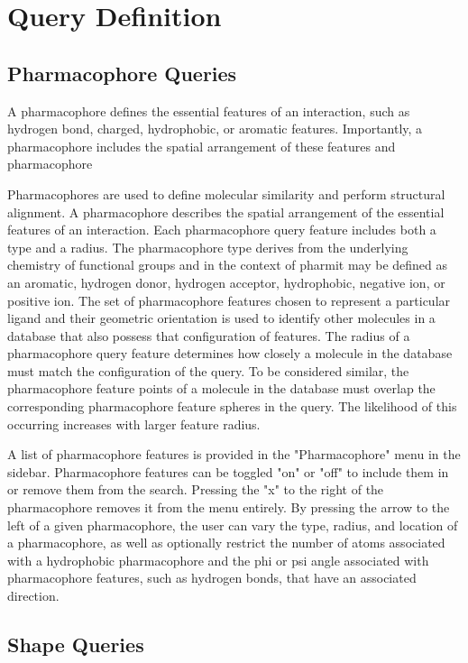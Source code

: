 \section{Query Definition}

\subsection{Pharmacophore Queries}
A pharmacophore \cite{Koes_2015rev,Yang_2010,Leach_2010} defines the essential features of an interaction, such as hydrogen bond, charged, hydrophobic, or aromatic features. Importantly, a pharmacophore includes the spatial arrangement of these features and pharmacophore


Pharmacophores are used to define molecular similarity and perform structural alignment. A pharmacophore describes the spatial arrangement of the essential features of an interaction. Each pharmacophore query feature includes both a type and a radius. The pharmacophore type derives from the underlying chemistry of functional groups and in the context of pharmit may be defined as an aromatic, hydrogen donor, hydrogen acceptor, hydrophobic, negative ion, or positive ion. The set of pharmacophore features chosen to represent a particular ligand and their geometric orientation is used to identify other molecules in a database that also possess that configuration of features. The radius of a pharmacophore query feature determines how closely a molecule in the database must match the configuration of the query. To be considered similar, the pharmacophore feature points of a molecule in the database must overlap the corresponding pharmacophore feature spheres in the query. The likelihood of this occurring increases with larger feature radius.

A list of pharmacophore features is provided in the "Pharmacophore" menu in the sidebar. Pharmacophore features can be toggled "on" or "off" to include them in or remove them from the search. Pressing the "x" to the right of the pharmacophore removes it from the menu entirely. By pressing the arrow to the left of a given pharmacophore, the user can vary the type, radius, and location of a pharmacophore, as well as optionally restrict the number of atoms associated with a hydrophobic pharmacophore and the phi or psi angle associated with pharmacophore features, such as hydrogen bonds, that have an associated direction.


\subsection{Shape Queries}

